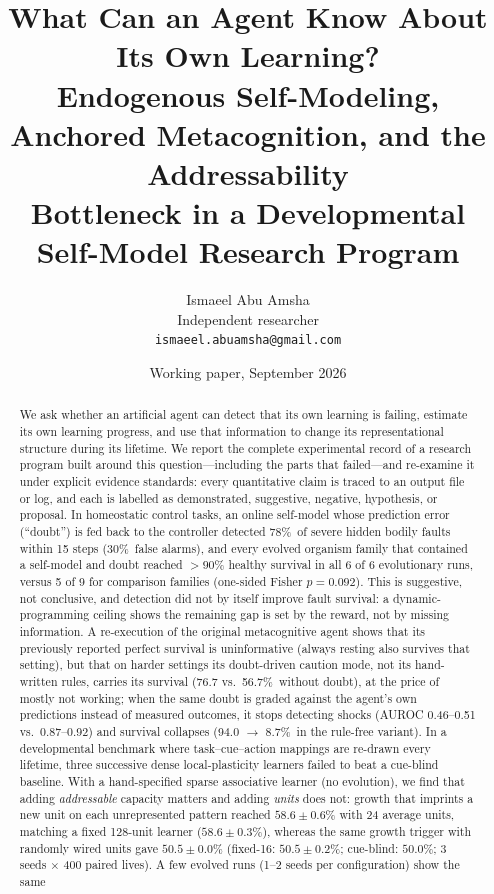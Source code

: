 \documentclass[11pt]{article}
\title{\textbf{What Can an Agent Know About Its Own Learning?}\\[4pt]
\large Endogenous Self-Modeling, Anchored Metacognition, and the Addressability\\
Bottleneck in a Developmental Self-Model Research Program}
\author{Ismaeel Abu Amsha\\
\small Independent researcher\\
\small\texttt{ismaeel.abuamsha@gmail.com}}
\date{Working paper, September 2026}
\theoremstyle{remark}
\newcommand{\pct}{\%}
\begin{document}
\maketitle

\begin{abstract}
We ask whether an artificial agent can detect that its own learning is failing, estimate its own learning
progress, and use that information to change its representational structure during its lifetime. We report
the complete experimental record of a research program built around this question---including the parts that
failed---and re-examine it under explicit evidence standards: every quantitative claim is traced to an output
file or log, and each is labelled as demonstrated, suggestive, negative, hypothesis, or proposal.
In homeostatic control tasks, an online self-model whose prediction error (``doubt'') is fed back to the
controller detected 78\pct\ of severe hidden bodily faults within 15 steps (30\pct\ false alarms), and every
evolved organism family that contained a self-model and doubt reached ${>}90\pct$ healthy survival in all 6 of 6
evolutionary runs, versus 5 of 9 for comparison families (one-sided Fisher $p=0.092$). This is suggestive, not
conclusive, and detection did not by itself improve fault survival: a dynamic-programming ceiling shows the
remaining gap is set by the reward, not by missing information. A re-execution of the original
metacognitive agent shows that its previously reported perfect survival is uninformative (always resting also
survives that setting), but that on harder settings its doubt-driven caution mode, not its hand-written rules,
carries its survival (76.7 vs.\ 56.7\pct\ without doubt), at the price of mostly not working; when the same doubt is
graded against the agent's own predictions instead of measured outcomes, it stops detecting shocks (AUROC 0.46--0.51
vs.\ 0.87--0.92) and survival collapses (94.0 $\to$ 8.7\pct\ in the rule-free variant). In a developmental benchmark where task--cue--action mappings are re-drawn
every lifetime, three successive dense local-plasticity learners failed to beat a cue-blind baseline. With a
hand-specified sparse associative learner (no evolution), we find that adding \emph{addressable} capacity
matters and adding \emph{units} does not: growth that imprints a new unit on each unrepresented pattern reached
$58.6\pm0.6\pct$ with 24 average units, matching a fixed 128-unit learner ($58.6\pm0.3\pct$), whereas the same
growth trigger with randomly wired units gave $50.5\pm0.0\pct$ (fixed-16: $50.5\pm0.2\pct$; cue-blind:
$50.0\pct$; 3 seeds $\times$ 400 paired lives). A few evolved runs (1--2 seeds per configuration) show the same

\end{abstract}
\end{document}
